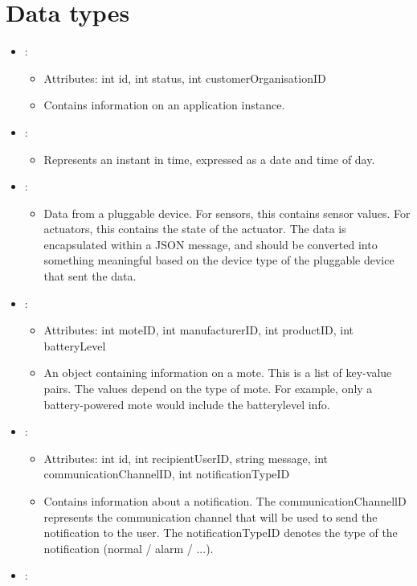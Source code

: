 \section{Data types}\label{sec:datatypes}
\begin{itemize}[nolistsep,noitemsep]
\item {}: 
\begin{itemize}[noitemsep,nolistsep]
\item[] Attributes: int id, int status, int customerOrganisationID
\item[] Contains information on an application instance.
\end{itemize}
\item {}: 
\begin{itemize}[noitemsep,nolistsep]

\item[] Represents an instant in time, expressed as a date and time of day.
\end{itemize}
\item {}: 
\begin{itemize}[noitemsep,nolistsep]

\item[] Data from a pluggable device. For sensors, this contains sensor values. For actuators, this contains the state of the actuator. The data is encapsulated within a JSON message, and should be converted into something meaningful based on the device type of the pluggable device that sent the data.
\end{itemize}
\item {}: 
\begin{itemize}[noitemsep,nolistsep]
\item[] Attributes: int moteID, int manufacturerID, int productID, int batteryLevel
\item[] An object containing information on a mote. This is a list of key-value pairs. The values depend on the type of mote. For example, only a battery-powered mote would include the batterylevel info.
\end{itemize}
\item {}: 
\begin{itemize}[noitemsep,nolistsep]
\item[] Attributes: int id, int recipientUserID, string message, int communicationChannelID, int notificationTypeID
\item[] Contains information about a notification. The communicationChannellD represents the communication channel that will be used to send the notification to the user. The notificationTypeID denotes the type of the notification (normal / alarm / ...).
\end{itemize}
\item {}: 
\begin{itemize}


\end{itemize}
\end{itemize}
